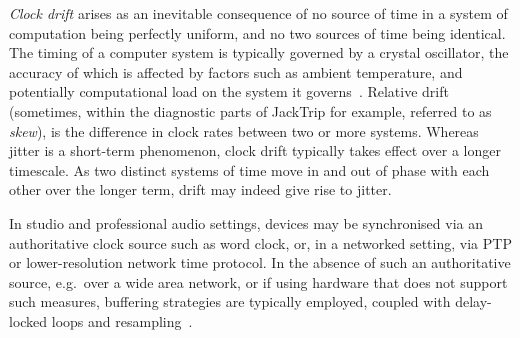 \textit{Clock drift} arises as an inevitable consequence of no source of time
in a system of computation being perfectly uniform, and no two sources of time
being identical.
The timing of a computer system is typically governed by a crystal oscillator,
the accuracy of which is affected by factors such as ambient temperature, and
potentially computational load on the system it
governs~\citep{marouani_internal_2008}.
Relative drift (sometimes, within the diagnostic parts of JackTrip for example,
referred to as \textit{skew}), is the difference in clock rates between two or
more systems.
Whereas jitter is a short-term phenomenon, clock drift typically takes effect
over a longer timescale.
As two distinct systems of time move in and out of phase with each other over
the longer term, drift may indeed give rise to jitter.

In studio and professional audio settings, devices may be synchronised via an
authoritative clock source such as word clock, or, in a networked setting,
via PTP or lower-resolution network time protocol.
In the absence of such an authoritative source, e.g.\ over a wide area network,
or if using hardware that does not support such measures, buffering strategies
are typically employed, coupled with delay-locked
loops and resampling~\citep{adriaensen_using_2005, adriaensen_controlling_2012}.
